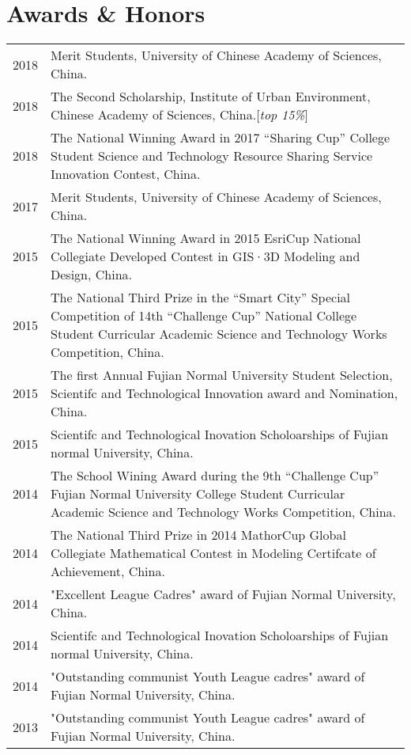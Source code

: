 \section*{Awards \& Honors}

\begin{tabular}{p{} p{}}
2018 & Merit Students, University of Chinese Academy of Sciences, China.\\
2018 & The Second Scholarship, Institute of Urban Environment, Chinese Academy of Sciences, China.[\textit{top 15\%}] \\
2018 & The National Winning Award in 2017 “Sharing Cup” College Student Science and Technology Resource Sharing Service Innovation Contest, China.\\
2017 & Merit Students, University of Chinese Academy of Sciences, China. \\
2015 & The National Winning Award in 2015 EsriCup National Collegiate Developed Contest in GIS·3D Modeling and Design, China.\\
2015 & The National Third Prize in the “Smart City” Special Competition of 14th “Challenge Cup” National College Student Curricular Academic Science and Technology Works Competition, China.\\
2015 & The first Annual Fujian Normal University Student Selection, Scientifc and Technological Innovation award and Nomination, China.\\
2015 & Scientifc and Technological Inovation Scholoarships of Fujian normal University, China.\\
2014 & The School Wining Award during the 9th “Challenge Cup” Fujian Normal University College Student Curricular Academic Science and Technology Works Competition, China.\\
2014 & The National Third Prize in 2014 MathorCup Global Collegiate Mathematical Contest in Modeling Certifcate of Achievement, China.\\
2014 & "Excellent League Cadres" award of Fujian Normal University, China.\\
2014 & Scientifc and Technological Inovation Scholoarships of Fujian normal University, China.\\
2014 & "Outstanding communist Youth League cadres" award of Fujian Normal University, China.\\
2013 & "Outstanding communist Youth League cadres" award of Fujian Normal University, China.\\
\end{tabular}
